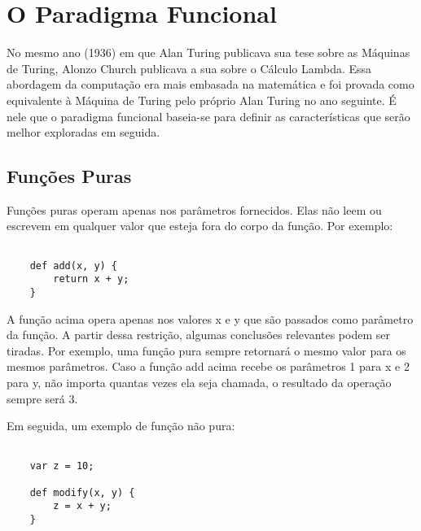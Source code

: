 \chapter{O Paradigma Funcional}




No mesmo ano (1936) em que Alan Turing publicava sua 
tese sobre as Máquinas de Turing, Alonzo Church publicava 
a sua sobre o Cálculo Lambda. Essa abordagem da computação 
era mais embasada na matemática e foi provada como 
equivalente à Máquina de Turing pelo próprio Alan Turing 
no ano seguinte. É nele que o paradigma funcional 
baseia-se para definir as características que serão 
melhor exploradas em seguida.


\section{Funções Puras}

Funções puras operam apenas nos parâmetros fornecidos. 
Elas não leem ou escrevem em qualquer valor que esteja 
fora do corpo da função. Por exemplo:

\begin{lstlisting}[caption={Exemplo de Função Pura},label=purefunction]

    def add(x, y) {
        return x + y;
    }

\end{lstlisting}

A função acima opera apenas nos valores x e y que 
são passados como parâmetro da função. A partir 
dessa restrição, algumas conclusões relevantes podem 
ser tiradas. Por exemplo, uma função pura sempre 
retornará o mesmo valor para os mesmos parâmetros. 
Caso a função add acima recebe os parâmetros 1 para x 
e 2 para y, não importa quantas vezes ela seja chamada, 
o resultado da operação sempre será 3.

Em seguida, um exemplo de função não pura:

\begin{lstlisting}[caption={Exemplo de Função Pura},label=purefunction]

    var z = 10;

    def modify(x, y) {
        z = x + y;
    }

\end{lstlisting}

